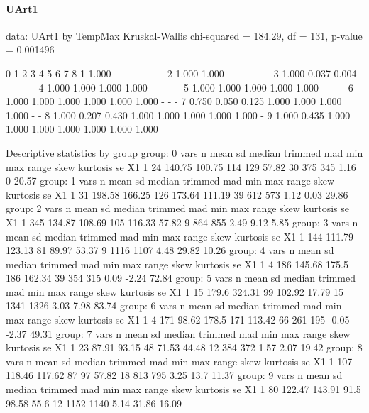 \documentclass[a4paper,headsepline,footsepline,fontsize=11pt,BCOR=12mm,DIV=12]{report}
\begin{document}
\paragraph{UArt1}

data:  UArt1 by TempMax
Kruskal-Wallis chi-squared = 184.29, df = 131, p-value = 0.001496

  0     1     2     3     4     5     6     7     8    
1 1.000 -     -     -     -     -     -     -     -    
2 1.000 1.000 -     -     -     -     -     -     -    
3 1.000 0.037 0.004 -     -     -     -     -     -    
4 1.000 1.000 1.000 1.000 -     -     -     -     -    
5 1.000 1.000 1.000 1.000 1.000 -     -     -     -    
6 1.000 1.000 1.000 1.000 1.000 1.000 -     -     -    
7 0.750 0.050 0.125 1.000 1.000 1.000 1.000 -     -    
8 1.000 0.207 0.430 1.000 1.000 1.000 1.000 1.000 -    
9 1.000 0.435 1.000 1.000 1.000 1.000 1.000 1.000 1.000

 Descriptive statistics by group 
group: 0
   vars  n   mean     sd median trimmed   mad min max range skew kurtosis    se
X1    1 24 140.75 100.75    114     129 57.82  30 375   345 1.16        0 20.57
group: 1
   vars  n   mean     sd median trimmed    mad min max range skew kurtosis    se
X1    1 31 198.58 166.25    126  173.64 111.19  39 612   573 1.12     0.03 29.86
group: 2
   vars   n   mean     sd median trimmed   mad min max range skew kurtosis   se
X1    1 345 134.87 108.69    105  116.33 57.82   9 864   855 2.49     9.12 5.85
group: 3
   vars   n   mean     sd median trimmed   mad min  max range skew kurtosis    se
X1    1 144 111.79 123.13     81   89.97 53.37   9 1116  1107 4.48    29.82 10.26
group: 4
   vars n mean     sd median trimmed    mad min max range skew kurtosis    se
X1    1 4  186 145.68  175.5     186 162.34  39 354   315 0.09    -2.24 72.84
group: 5
   vars  n  mean     sd median trimmed   mad min  max range skew kurtosis    se
X1    1 15 179.6 324.31     99  102.92 17.79  15 1341  1326 3.03     7.98 83.74
group: 6
   vars n mean    sd median trimmed    mad min max range  skew kurtosis    se
X1    1 4  171 98.62  178.5     171 113.42  66 261   195 -0.05    -2.37 49.31
group: 7
   vars  n  mean    sd median trimmed   mad min max range skew kurtosis    se
X1    1 23 87.91 93.15     48   71.53 44.48  12 384   372 1.57     2.07 19.42
group: 8
   vars   n   mean     sd median trimmed   mad min max range skew kurtosis    se
X1    1 107 118.46 117.62     87      97 57.82  18 813   795 3.25     13.7 11.37
group: 9
   vars  n   mean     sd median trimmed  mad min  max range skew kurtosis    se
X1    1 80 122.47 143.91   91.5   98.58 55.6  12 1152  1140 5.14    31.86 16.09
\end{document}

